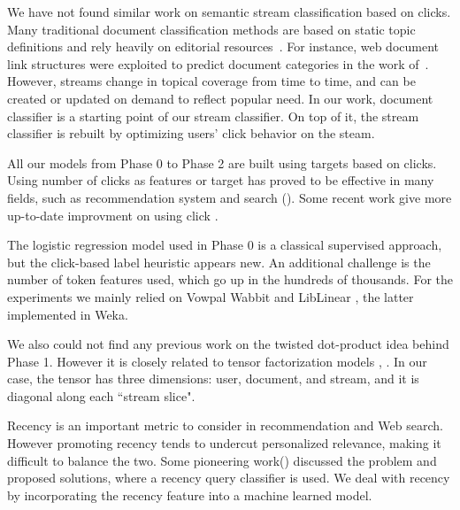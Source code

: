 
We have not found similar work on semantic stream classification based on 
clicks. Many traditional document classification methods are based on static 
topic definitions and rely heavily on editorial 
resources~\cite{Sun:2002:WCU:584931.584952}. For instance, web document link 
structures were exploited to predict document categories in the work 
of~\cite{Calado:2006:LSM:1108519.1108533}.
 However, streams change in topical coverage from time to time, and can be 
created or updated on demand to reflect popular need. In our work, document 
classifier is a starting point of our stream classifier. On top of it, the 
stream classifier is rebuilt by optimizing users' click behavior on the 
steam.  





All our models from Phase 0 to Phase 2 are built using targets based on clicks. Using number of clicks as features or target has proved to be effective in many fields, such as recommendation system and search (\cite{Agarwal:2013:CRW:2461256.2461277,Liu:2010:PNR:1719970.1719976}). Some recent work give more up-to-date improvment on using click \cite{Li:2010:CAP:1772690.1772758}.

The logistic regression model used in Phase 0 is a classical supervised approach\cite{ESL}, but the click-based label heuristic appears new. An additional challenge is the number of token features used, which go up in the hundreds of thousands. For the experiments we mainly relied on Vowpal Wabbit \cite{FeatureHashing} and LibLinear \cite{liblinear}, the latter implemented in Weka. 

We also could not find any previous work on the twisted dot-product idea behind Phase 1. However it is closely related to tensor factorization models \cite{rendle2009learning}, \cite{zheng2010flickr}. In our case, the tensor has three dimensions: user, document, and stream, and it is diagonal along each ``stream slice".

Recency is an important metric to consider in recommendation and Web search. 
However promoting recency tends to undercut personalized relevance, making it 
difficult to balance the two. Some pioneering 
work(\cite{Dong:2010:TRR:1718487.1718490}) discussed the problem and proposed 
solutions, where a recency query classifier is used. We deal with recency by 
incorporating the recency feature into a machine learned model.
